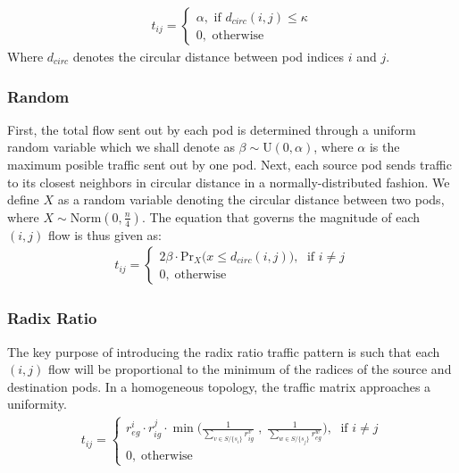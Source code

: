 \documentclass[sigconf]{acmart}
\theoremstyle{definition}
\begin{document}
\begin{appendices}
\begin{equation}
\begin{aligned}
t_{ij} = \begin{cases}
                \alpha, \text{ if } d_{circ}(i,j) \leq \kappa\\
                0, \text{ otherwise}
        \end{cases}
\end{aligned}
\label{eqn:knn}
\end{equation}
Where $d_{circ}$ denotes the circular distance between pod indices $i$ and $j$.
\subsubsection{Random\\}
First, the total flow sent out by each pod is determined through a uniform random variable which we shall denote as $\beta \sim \text{U}(0, \alpha)$, where $\alpha$ is the maximum posible traffic sent out by one pod. Next, each source pod sends traffic to its closest neighbors in circular distance in a normally-distributed fashion. We define $X$ as a random variable denoting the circular distance between two pods, where $X \sim \text{Norm}(0, \frac{n}{4})$. The equation that governs the magnitude of each $(i,j )$ flow is thus given as:
\begin{equation}
\begin{aligned}
t_{ij} = 
\begin{cases}
2\beta \cdot \text{{Pr}}_{X}\big(x \leq d_{circ}(i, j)\big), \; \text{ if } i \neq j\\
0, \; \text{otherwise}
\end{cases}
\end{aligned}
\label{eqn:random}
\end{equation}


\subsubsection{Radix Ratio\\}
The key purpose of introducing the radix ratio traffic pattern is such that each $(i,j)$ flow will be proportional to the minimum of the radices of the source and destination pods. In a homogeneous topology, the traffic matrix approaches a uniformity.
\begin{equation}
\begin{aligned}
t_{ij} = 
\begin{cases}
r_{eg}^{i} \cdot r_{ig}^{j} \cdot \min\Big(\frac{1}{\sum\limits_{v \in S/\{s_i\}}r_{ig}^v}\; , \; \frac{1}{\sum\limits_{w \in S/\{s_j\}}r_{eg}^w}\Big), \; \text{ if } i \neq j\\
0, \; \text{otherwise}
\end{cases}
\end{aligned}
\label{eqn:radix_ratio}
\end{equation}




\end{appendices}
\end{document}
